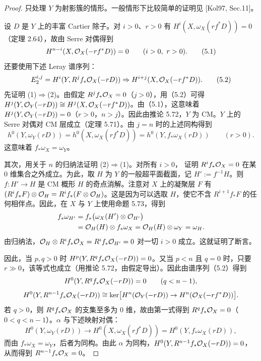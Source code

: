 \begin{proof}
只处理 $Y$ 为射影簇的情形。一般情形下比较简单的证明见 [Kol97, Sec.11]。

设 $D$ 是 $Y$ 上的丰富 Cartier 除子。对 $i>0$、$r>0$ 有 $H^i(X,\omega_X(rf^*D))=0$（定理 2.64），故由 Serre 对偶得到
\begin{equation}
H^{n-i}(X,\cO_X(-rf^*D))=0\qquad(i>0,\ r>0).\tag{5.1}
\end{equation}
还要使用下述 Leray 谱序列：
\begin{equation}
E_2^{i,j}=H^i(Y,R^jf_*\mathcal{O}_X(-rD))\Rightarrow H^{i+j}(X,\mathcal{O}_X(-rf^*D)).\tag{5.2}
\end{equation}
先证明 (1)$\Rightarrow$(2)。由假定 $R^jf_*\mathcal{O}_X=0$（$j>0$），用（5.2）可得 $H^j(Y,\mathcal{O}_Y(-rD))\cong H^j(X,\mathcal{O}_X(-rf^*D))$。由（5.1），这意味着 $H^j(Y,\mathcal{O}_Y(-rD))=0$（$r>0$，$n>j$）。因此由推论 5.72，$Y$ 为 CM。$Y$ 上的 Serre 对偶对 CM 层成立（定理 5.71）。由 $j=n$ 时的上述同构得到
\[
h^0(Y,\omega_Y(rD))=h^0(X,\omega_X(rf^*D))=h^0(Y,f_*\omega_X(rD))\qquad(r>0).
\]
这意味着 $f_*\omega_X=\omega_Y$。

其次，用关于 $n$ 的归纳法证明 (2)$\Rightarrow$(1)。对所有 $i>0$，
证明 $R^if_*\mathcal{O}_X=0$ 在某 $0$ 维集合之外成立。为此，取 $H$ 为 $Y$ 的一般超平面截面，记 $H':=f^{-1}H$。则 $f\colon H'\to H$ 是 CM 概形 $H$ 的奇点消解。注意对 $X$ 上的凝聚层 $F$ 有 $(R^if_*F)\otimes\mathcal{O}_H=R^if_*(F\otimes\mathcal{O}_H)$。这是因为可以选取 $H$，使它不含 $R^{i+1}f_*F$ 的任何相伴点。因此，在 $X$ 与 $Y$ 上使用命题 5.73，得到
\[
\begin{aligned}
f_*\omega_{H'} &= f_*\bigl(\omega_X(H')\otimes\mathcal{O}_{H'}\bigr)\\
&= \mathcal{O}_H(H)\otimes f_*\omega_X=\mathcal{O}_H(H)\otimes\omega_Y=\omega_H.
\end{aligned}
\]
由归纳法，$\mathcal{O}_H\otimes R^if_*\mathcal{O}_X=R^if_*\mathcal{O}_{H'}=0$ 对一切 $i>0$ 成立。这就证明了断言。

因此，当 $p,q>0$ 时 $H^p(Y,R^qf_*\mathcal{O}_X(-rD))=0$。又当 $p<n$ 且 $q=0$ 时，只要 $r\gg0$，该等式也成立（用推论 5.72，由假定导出）。因此由谱序列（5.2）得到
\[
H^0(Y,R^qf_*\mathcal{O}_X(-rD))=0\qquad(q<n-1),
\]
\[
H^0(Y,R^{n-1}f_*\mathcal{O}_X(-rD))\cong\ker\bigl[H^n(\mathcal{O}_Y(-rD))\to H^n(\mathcal{O}_X(-rf^*D))\bigr].
\]
若 $q>0$，则 $R^qf_*\mathcal{O}_X$ 的支集至多为 $0$ 维，故由第一式得到 $R^qf_*\mathcal{O}_X=0$（$0<q<n-1$）。$\alpha$ 与下述映射对偶：
\[
H^0(Y,\omega_Y(rD))\to H^0(X,\omega_X(rf^*D))=H^0(Y,f_*\omega_X(rD)),
\]
而由 $f_*\omega_X=\omega_Y$，后者为同构。由此 $\alpha$ 为同构，$H^0(Y,R^{n-1}f_*\mathcal{O}_X(-rD))=0$，从而得到 $R^{n-1}f_*\mathcal{O}_X=0$。
\end{proof}

